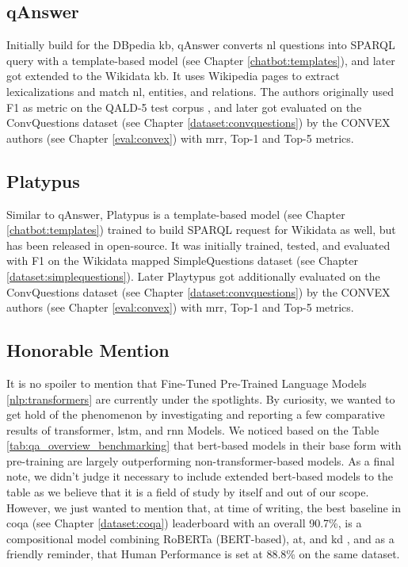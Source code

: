 \subsection{qAnswer}
Initially build for the DBpedia \gls{kb}, qAnswer converts \gls{nl} questions into SPARQL query with a template-based model (see Chapter \ref{chatbot:templates}), and later got extended to the Wikidata \gls{kb}. It uses Wikipedia pages to extract lexicalizations and match \gls{nl}, entities, and relations. The authors originally used F1 as metric on the QALD-5 test corpus \autocite{paper:Lopezetal2013}, and later got evaluated on the ConvQuestions dataset (see Chapter \ref{dataset:convquestions}) by the CONVEX authors (see Chapter \ref{eval:convex}) with \gls{mrr}, Top-1 and Top-5 metrics.

\subsection{Platypus}
Similar to qAnswer, Platypus \autocite{paper:InProceedingsPellissier-Tanon.P-TD-d-ACM-S_18} is a template-based model (see Chapter \ref{chatbot:templates}) trained to build SPARQL request for Wikidata as well, but has been released in open-source. It was initially trained, tested, and evaluated with F1 on the Wikidata mapped SimpleQuestions dataset (see Chapter \ref{dataset:simplequestions}). Later Playtypus got additionally evaluated on the ConvQuestions dataset (see Chapter \ref{dataset:convquestions}) by the CONVEX authors (see Chapter \ref{eval:convex}) with \gls{mrr}, Top-1 and Top-5 metrics.

\subsection{Honorable Mention}
It is no spoiler to mention that Fine-Tuned Pre-Trained Language Models \ref{nlp:transformers} are currently under the spotlights. By curiosity, we wanted to get hold of the phenomenon by investigating and reporting a few comparative results of \gls{transformer}, \gls{lstm}, and \gls{rnn} Models. We noticed based on the Table \ref{tab:qa_overview_benchmarking} that \gls{bert}-based \autocite{paper:devlin-etal-2019-bert} models in their base form with pre-training are largely outperforming non-\gls{transformer}-based models. As a final note, we didn't judge it necessary to include extended \gls{bert}-based models to the table as we believe that it is a field of study by itself and out of our scope. However, we just wanted to mention that, at time of writing, the best baseline in \gls{coqa} (see Chapter \ref{dataset:coqa}) leaderboard with an overall 90.7\%, is a compositional model combining RoBERTa \autocite{paper:journals/corr/abs-1907-11692} (BERT-based), \gls{at}, and \gls{kd} \autocite{paper:2019arXiv190910772J}, and as a friendly reminder, that Human Performance is set at 88.8\% on the same dataset.


